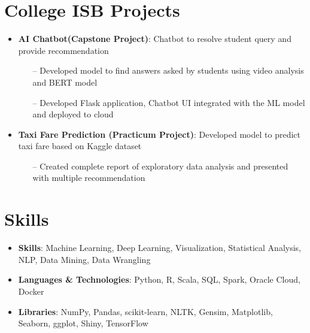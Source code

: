 \documentclass[letterpaper,10pt]{article}
\newcommand{\resumeItem}[2]{
  \item\small{
    \textbf{#1}{: #2 \vspace{-2pt}}
  }
}
\newcommand{\resumeSubItem}[2]{\resumeItem{#1}{#2}\vspace{-4pt}}
\newcommand{\resumeSubHeadingListStart}{\begin{itemize}[leftmargin=*]}
\newcommand{\resumeSubHeadingListEnd}{\end{itemize}}
\begin{document}
\section{College ISB Projects}
\resumeSubHeadingListStart
\resumeSubItem{AI Chatbot(Capstone Project)}
{Chatbot to resolve student query and provide recommendation}
\begin{itemize}
  \item[--] Developed model to find answers asked by students using video analysis and BERT model
  \item[--] Developed Flask application, Chatbot UI integrated with the ML model and deployed to cloud
\end{itemize}
\resumeSubItem{Taxi Fare Prediction (Practicum Project)}
{Developed model to predict taxi fare based on Kaggle dataset}
\begin{itemize}
  \item[--] Created complete report of exploratory data analysis and presented with multiple recommendation
\end{itemize}
\resumeSubHeadingListEnd


\section{Skills}
\resumeSubHeadingListStart
\item{
            \textbf{Skills}{: Machine Learning, Deep Learning, Visualization, Statistical Analysis, NLP, Data Mining, Data Wrangling}
      }
\item {
            \textbf{Languages \& Technologies}{: Python, R, Scala, SQL, Spark, Oracle Cloud, Docker}
      }
\item {
            \textbf{Libraries}{: NumPy, Pandas, scikit-learn, NLTK, Gensim, Matplotlib, Seaborn, ggplot, Shiny,  TensorFlow}
      }
\resumeSubHeadingListEnd


\end{document}
